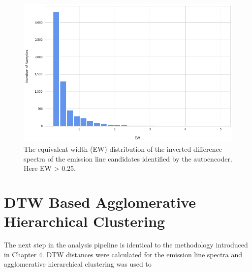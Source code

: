 \begin{figure}[!htb]
\centering
\includegraphics[scale=0.45]{figures/EW hist.png}
\caption{The equivalent width (EW) distribution of the inverted difference spectra of the emission line candidates identified by the autoencoder. Here EW > 0.25.}
\end{figure}

\section{DTW Based Agglomerative Hierarchical Clustering}

The next step in the analysis pipeline is identical to the methodology introduced in Chapter 4. DTW distances were calculated for the emission line spectra and agglomerative hierarchical clustering was used to 

